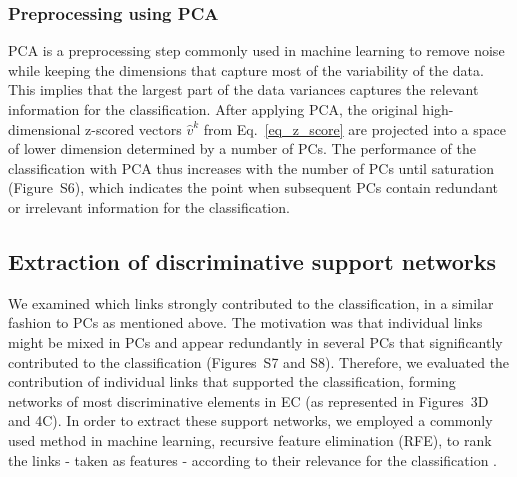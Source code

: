 \documentclass{article}
\begin{document}
\subsubsection{Preprocessing using PCA}

PCA is a preprocessing step commonly used in machine learning to remove noise while keeping the dimensions that capture most of the variability of the data. This implies that the largest part of the data variances captures the relevant information for the classification. After applying PCA, the original high-dimensional z-scored vectors $\hat{v}^k$ from Eq.~\eqref{eq_z_score} are projected into a space of lower dimension determined by a number of PCs. The performance of the classification with PCA thus increases with the number of PCs until saturation (Figure~S6), which indicates the point when subsequent PCs contain redundant or irrelevant information for the classification. 

\subsection{Extraction of discriminative support networks}

We examined which links strongly contributed to the classification, in a similar fashion to PCs as mentioned above. The motivation was that individual links might be mixed in PCs and appear redundantly in several PCs that significantly contributed to the classification (Figures~S7 and S8). Therefore, we evaluated the contribution of individual links that supported the classification, forming networks of most discriminative elements in EC (as represented in Figures~3D and 4C).
In order to extract these support networks, we employed a commonly used method in machine learning, recursive feature elimination (RFE), to rank the links - taken as features - according to their relevance for the classification \cite{Guyon_ML_2002}. 
\end{document}

